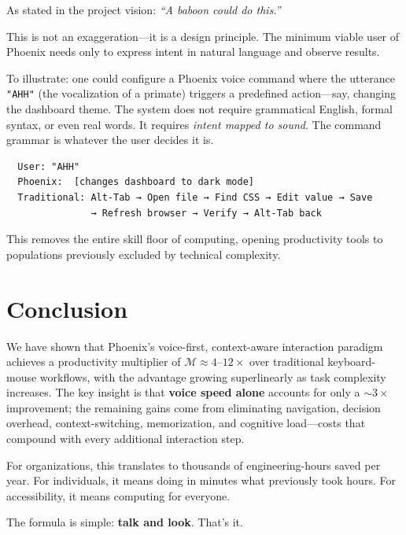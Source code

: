 \documentclass[11pt, a4paper]{article}
\begin{document}
As stated in the project vision: \emph{``A baboon could do this.''}

This is not an exaggeration---it is a design principle. The minimum viable user
of Phoenix needs only to express intent in natural language and observe results.

To illustrate: one could configure a Phoenix voice command where the utterance
\texttt{"AHH"} (the vocalization of a primate) triggers a predefined
action---say, changing the dashboard theme. The system does not require grammatical
English, formal syntax, or even real words. It requires \emph{intent mapped to
sound}. The command grammar is whatever the user decides it is.

\begin{verbatim}
  User: "AHH"
  Phoenix:  [changes dashboard to dark mode]
  Traditional: Alt-Tab → Open file → Find CSS → Edit value → Save
               → Refresh browser → Verify → Alt-Tab back
\end{verbatim}

This removes the entire skill floor of computing, opening productivity tools to
populations previously excluded by technical complexity.

\section{Conclusion}

We have shown that Phoenix's voice-first, context-aware interaction paradigm
achieves a productivity multiplier of $\mathcal{M} \approx 4\text{--}12\times$
over traditional keyboard-mouse workflows, with the advantage growing
superlinearly as task complexity increases. The key insight is that
\textbf{voice speed alone} accounts for only a $\sim\!3\times$ improvement;
the remaining gains come from eliminating navigation, decision overhead,
context-switching, memorization, and cognitive load---costs that compound
with every additional interaction step.

For organizations, this translates to thousands of engineering-hours saved per
year. For individuals, it means doing in minutes what previously took hours.
For accessibility, it means computing for everyone.

The formula is simple: \textbf{talk and look}. That's it.
\end{document}
